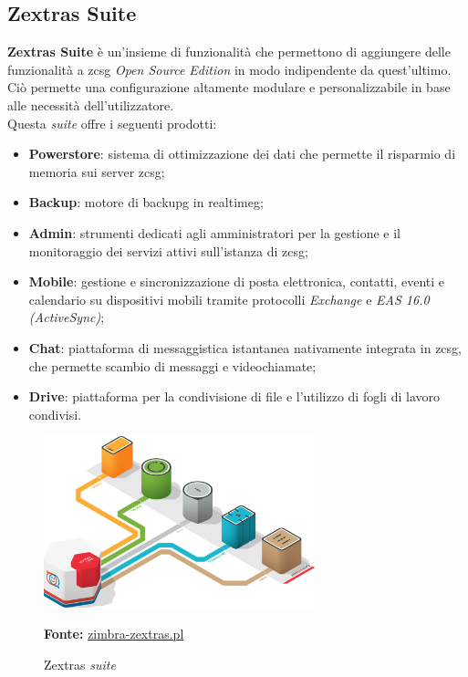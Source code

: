     \subsection{Zextras Suite}
        \textbf{Zextras Suite} è un'insieme di funzionalità che permettono di aggiungere delle funzionalità a \gls{zcsg} \textit{Open Source Edition} in modo indipendente da quest'ultimo. Ciò permette una configurazione altamente modulare e personalizzabile in base alle necessità dell'utilizzatore. \\
        Questa \textit{suite} offre i seguenti prodotti:
        \begin{itemize}
            \setlength\itemsep{0em}
            \item \textbf{Powerstore}: sistema di ottimizzazione dei dati che permette il risparmio di memoria sui server \gls{zcsg};
            \item \textbf{Backup}: motore di \gls{backupg} in \gls{realtimeg};
            \item \textbf{Admin}: strumenti dedicati agli amministratori per la gestione e il monitoraggio dei servizi attivi sull'istanza di \gls{zcsg};
            \item \textbf{Mobile}: gestione e sincronizzazione di posta elettronica, contatti, eventi e calendario su dispositivi mobili tramite protocolli \textit{Exchange} e \textit{EAS 16.0 (ActiveSync)};
            \item \textbf{Chat}: piattaforma di messaggistica istantanea nativamente integrata in \gls{zcsg}, che permette scambio di messaggi e videochiamate;
            \item \textbf{Drive}: piattaforma per la condivisione di file e l'utilizzo di fogli di lavoro condivisi.
        \end{itemize}
        
        \begin{figure}[h]
            \centering
            \includegraphics[width=0.7\textwidth]{immagini/zextras_suite.png}
            \caption{Zextras \textit{suite}}
            \textbf{Fonte: }\href{https://www.zimbra-zextras.pl/}{zimbra-zextras.pl}
            \label{fig: Zextras suite}
        \end{figure}
        
